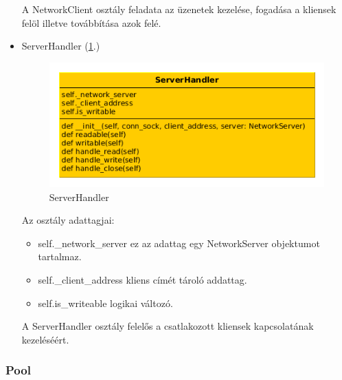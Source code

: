 \documentclass[a4paper,12pt,oneside]{report}
\begin{document}
\begin{itemize}
			A NetworkClient osztály feladata az üzenetek kezelése, fogadása a kliensek felöl illetve továbbítása azok felé.
			
		\item ServerHandler (\ref{fig:serverhandler}.)
			\begin{figure}[h]
			  \includegraphics[width=13cm,keepaspectratio]{serverhandler.png}
			  \caption{ServerHandler}
			  \label{fig:serverhandler}
			\end{figure}
			\newpage
			Az osztály adattagjai:
			\begin{itemize}
				\itemsep0em
					\item self.\_network\_server ez az adattag egy NetworkServer objektumot tartalmaz.
					\item self.\_client\_address kliens címét tároló addattag.
					\item self.is\_writeable logikai változó.
			\end{itemize}

		A ServerHandler osztály felelős a csatlakozott kliensek kapcsolatának kezeléséért.
			
\end{itemize}
\subsubsection{Pool}
\end{document}
